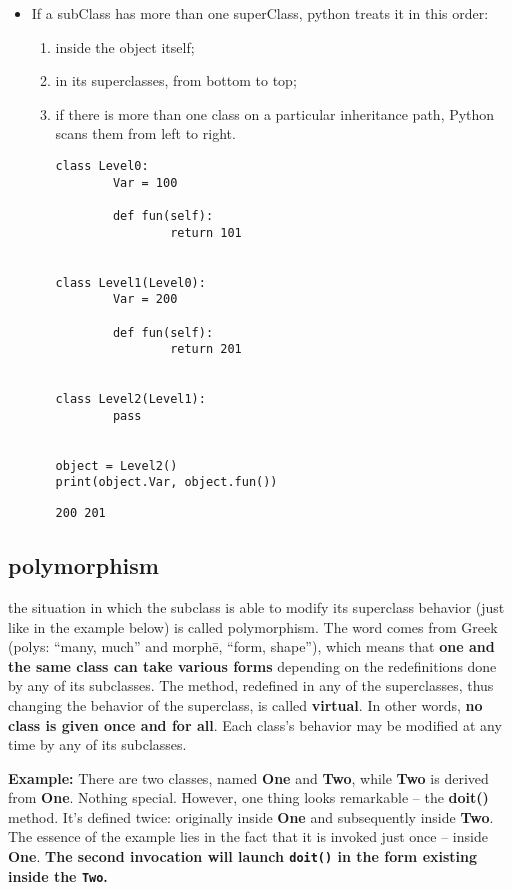 \documentclass[11pt]{article}
\begin{document}
\begin{itemize}
\item If a subClass has more than one superClass, python treats it in this
order:

\begin{enumerate}
\item inside the object itself;
\item in its superclasses, from bottom to top;
\item if there is more than one class on a particular inheritance path,
Python scans them from left to right.

\begin{verbatim}
class Level0:
        Var = 100

        def fun(self):
                return 101


class Level1(Level0):
        Var = 200

        def fun(self):
                return 201


class Level2(Level1):
        pass


object = Level2()
print(object.Var, object.fun())

\end{verbatim}

\begin{verbatim}
200 201
\end{verbatim}
\end{enumerate}
\end{itemize}
\subsection{polymorphism}
\label{sec:org6c29ca7}

the situation in which the subclass is able to modify its superclass
behavior (just like in the example below) is called polymorphism. The
word comes from Greek (polys: “many, much” and morphē, “form, shape”),
which means that \textbf{one and the same class can take various forms}
depending on the redefinitions done by any of its subclasses. The
method, redefined in any of the superclasses, thus changing the
behavior of the superclass, is called \textbf{virtual}. In other words, \textbf{no}
\textbf{class is given once and for all}. Each class’s behavior may be modified
at any time by any of its subclasses.


 \textbf{Example:} There are two classes, named \textbf{One} and \textbf{Two}, while \textbf{Two}
is derived from \textbf{One}. Nothing special. However, one thing looks
remarkable – the \textbf{doit()} method. It’s defined twice: originally
inside \textbf{One} and subsequently inside \textbf{Two}. The essence of the example
lies in the fact that it is invoked just once – inside \textbf{One}.
\textbf{The second invocation will launch \texttt{doit()} in the form existing inside the \texttt{Two}.}
\end{document}
